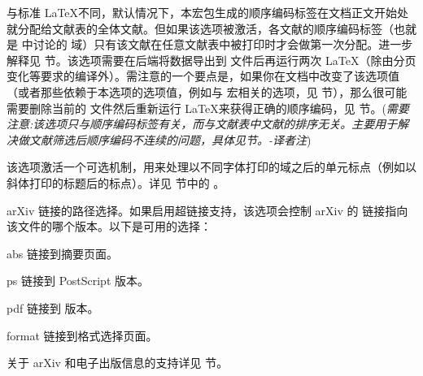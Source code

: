 \begin{optionlist}
与标准 \LaTeX 不同，默认情况下，本宏包生成的顺序编码标签在文档正文开始处就分配给文献表的全体文献。但如果该选项被激活，各文献的顺序编码标签（也就是  中讨论的  域）只有该文献在任意文献表中被打印时才会做第一次分配。进一步解释见  节。该选项需要在后端将数据导出到  文件后再运行两次 \LaTeX （除由分页变化等要求的编译外）。需注意的一个要点是，如果你在文档中改变了该选项值（或者那些依赖于本选项的选项值，例如与 宏相关的选项，见 节），那么很可能需要删除当前的  文件然后重新运行 \LaTeX 来获得正确的顺序编码，见  节。(\emph{需要注意:该选项只与顺序编码标签有关，而与文献表中文献的排序无关。主要用于解决做文献筛选后顺序编码不连续的问题，具体见节。-译者注})


该选项激活一个可选机制，用来处理以不同字体打印的域之后的单元标点（例如以斜体打印的标题后的标点）。详见  节中的 。


arXiv 链接的路径选择。如果启用超链接支持，该选项会控制 arXiv 的  链接指向该文件的哪个版本。以下是可用的选择：

\begin{valuelist}
\item[abs] %
链接到摘要页面。
\item[ps] %
链接到 PostScript 版本。
\item[pdf] %
链接到 \pdf 版本。
\item[format] %
链接到格式选择页面。
\end{valuelist}

关于 arXiv 和电子出版信息的支持详见  节。



\end{optionlist}
